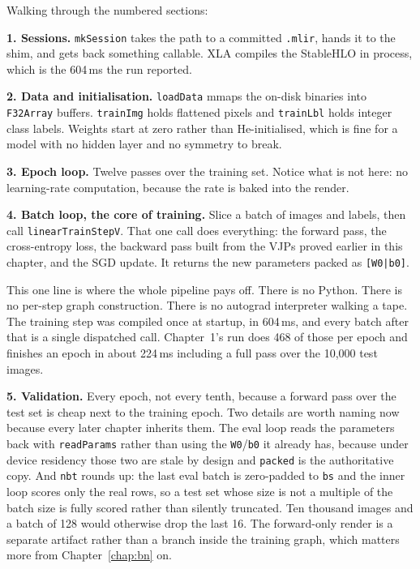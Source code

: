 Walking through the numbered sections:

\textbf{1. Sessions.} \texttt{mkSession} takes the path to a committed
\texttt{.mlir}, hands it to the shim, and gets back something callable.
XLA compiles the StableHLO in process, which is the 604\,ms the run
reported.

\textbf{2. Data and initialisation.} \texttt{loadData} mmaps the on-disk
binaries into \texttt{F32Array} buffers. \texttt{trainImg} holds
flattened pixels and \texttt{trainLbl} holds integer class labels.
Weights start at zero rather than He-initialised, which is fine for a
model with no hidden layer and no symmetry to break.

\textbf{3. Epoch loop.} Twelve passes over the training set. Notice what
is not here: no learning-rate computation, because the rate is baked
into the render.

\textbf{4. Batch loop, the core of training.} Slice a batch of images
and labels, then call \texttt{linearTrainStepV}. That one call does
everything: the forward pass, the cross-entropy loss, the backward pass
built from the VJPs proved earlier in this chapter, and the SGD update.
It returns the new parameters packed as \texttt{[W0|b0]}.

This one line is where the whole pipeline pays off. There is no Python.
There is no per-step graph construction. There is no autograd
interpreter walking a tape. The training step was compiled once at
startup, in 604\,ms, and every batch after that is a single dispatched
call. Chapter~1's run does 468 of those per epoch and finishes an epoch
in about 224\,ms including a full pass over the 10,000 test images.

\textbf{5. Validation.} Every epoch, not every tenth, because a forward
pass over the test set is cheap next to the training epoch. Two details
are worth naming now because every later chapter inherits them. The
eval loop reads the parameters back with \texttt{readParams} rather than
using the \texttt{W0}/\texttt{b0} it already has, because under device
residency those two are stale by design and \texttt{packed} is the
authoritative copy. And \texttt{nbt} rounds up: the last eval
batch is zero-padded to \texttt{bs} and the inner loop scores only the
real rows, so a test set whose size is not a multiple of the batch size
is fully scored rather than silently truncated. Ten thousand images and
a batch of 128 would otherwise drop the last 16. The
forward-only render is a separate artifact rather than a branch inside
the training graph, which matters more from Chapter~\ref{chap:bn} on.


